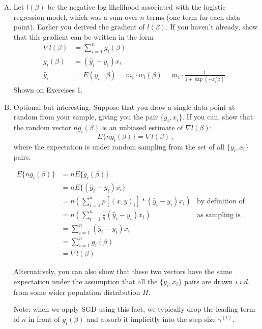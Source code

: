 \documentclass{article}
\begin{document}
\begin{enumerate}[(A)]

\item Let $l(\beta)$ be the negative log likelihood associated with the logistic regression model, which was a sum over $n$ terms (one term for each data point).  Earlier you derived the gradient of $l(\beta)$.  If you haven't already, show that this gradient can be written in the form
$$
\begin{aligned}
\nabla l(\beta) &=  \sum_{i=1}^n g_i(\beta)  \\
g_i(\beta) &= (\hat y_i - y_i) x_i \\
\hat{y}_i &= E(y_i \mid \beta) = m_i \cdot w_i(\beta) = m_i \cdot \frac{1}{1 + \exp(-x_i^T \beta)} \, .
\end{aligned}
$$
\color{blue}
Shown on Exercises 1.
\color{black}

\item Optional but interesting.  Suppose that you draw a single data point at random from your sample, giving you the pair $\{y_i, x_i\}$.  If you can, show that the random vector $n g_i(\beta)$ is an unbiased estimate of $\nabla l(\beta)$:
$$
E \{ n g_i(\beta) \} = \nabla l(\beta) \, ,
$$
where the expectation is under random sampling from the set of all $\{y_i, x_i\}$ pairs.  

\color{blue}
\begin{align*}
E \{ n g_i(\beta) \} 
&= n E \{ g_i(\beta) \} \\
&= n E \{ (\hat y_i - y_i) x_i \}  \\
&= n \left( \sum_{i=1}^n  p[(x,y)_i] * (\hat y_i - y_i) x_i\right)  & \text{by definition of expectation}\\
&= n \left( \sum_{i=1}^n  \frac{1}{n} (\hat y_i - y_i) x_i\right)  & \text{as sampling is random}\\
&=  \sum_{i=1}^n   (\hat y_i - y_i) x_i \\
&=  \sum_{i=1}^n  g_i(\beta) \\
&= \nabla l(\beta) 
\end{align*}
\color{black}

Alternatively, you can also show that these two vectors have the same expectation under the assumption that all the $\{y_i, x_i\}$ pairs are drawn $i.i.d.$ from some wider population distribution $\Pi$.

Note: when we apply SGD using this fact, we typically drop the leading term of $n$ in front of $g_i(\beta)$ and absorb it implicitly into the step size $\gamma^{(t)}$.


\end{enumerate}
\end{document}
